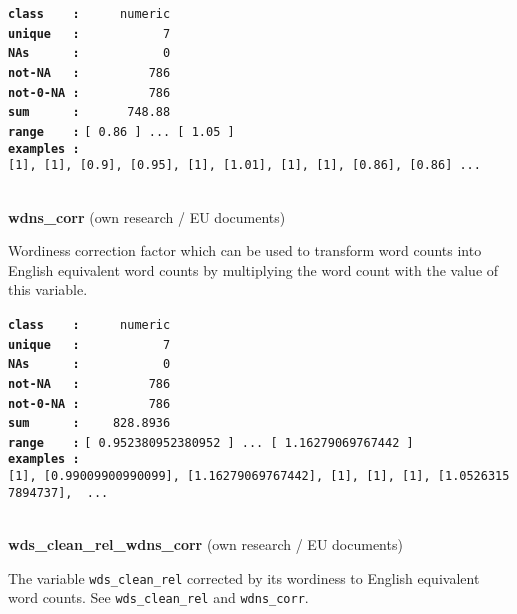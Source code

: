 \documentclass[]{article}
\begin{document}
\textbf{\texttt{class\ \ \ \ :}} \texttt{~~~~~numeric}\\
\textbf{\texttt{unique\ \ \ :}} \texttt{~~~~~~~~~~~7}\\
\textbf{\texttt{NAs\ \ \ \ \ \ :}} \texttt{~~~~~~~~~~~0}\\
\textbf{\texttt{not-NA\ \ \ :}} \texttt{~~~~~~~~~786}\\
\textbf{\texttt{not-0-NA\ :}} \texttt{~~~~~~~~~786}\\
\textbf{\texttt{sum\ \ \ \ \ \ :}} \texttt{~~~~~~748.88}\\
\textbf{\texttt{range\ \ \ \ :}}
\texttt{{[}\ 0.86\ {]}\ ...\ {[}\ 1.05\ {]}}\\
\textbf{\texttt{examples\ :}}
\texttt{{[}1{]},\ {[}1{]},\ {[}0.9{]},\ {[}0.95{]},\ {[}1{]},\ {[}1.01{]},\ {[}1{]},\ {[}1{]},\ {[}0.86{]},\ {[}0.86{]}\ ...}\\

~

\textbf{wdns\_corr} (own research / EU documents)

Wordiness correction factor which can be used to transform word counts
into English equivalent word counts by multiplying the word count with
the value of this variable.

\textbf{\texttt{class\ \ \ \ :}} \texttt{~~~~~numeric}\\
\textbf{\texttt{unique\ \ \ :}} \texttt{~~~~~~~~~~~7}\\
\textbf{\texttt{NAs\ \ \ \ \ \ :}} \texttt{~~~~~~~~~~~0}\\
\textbf{\texttt{not-NA\ \ \ :}} \texttt{~~~~~~~~~786}\\
\textbf{\texttt{not-0-NA\ :}} \texttt{~~~~~~~~~786}\\
\textbf{\texttt{sum\ \ \ \ \ \ :}} \texttt{~~~~828.8936}\\
\textbf{\texttt{range\ \ \ \ :}}
\texttt{{[}\ 0.952380952380952\ {]}\ ...\ {[}\ 1.16279069767442\ {]}}\\
\textbf{\texttt{examples\ :}}
\texttt{{[}1{]},\ {[}0.99009900990099{]},\ {[}1.16279069767442{]},\ {[}1{]},\ {[}1{]},\ {[}1{]},\ {[}1.05263157894737{]},\ \ ...}\\

~

\textbf{wds\_clean\_rel\_wdns\_corr} (own research / EU documents)

The variable \texttt{wds\_clean\_rel} corrected by its wordiness to
English equivalent word counts. See \texttt{wds\_clean\_rel} and
\texttt{wdns\_corr}.
\end{document}
